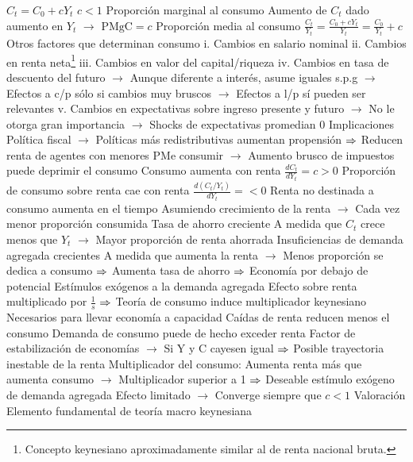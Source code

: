 \documentclass{nuevotema}
\begin{document}
\begin{esquemal}
				\4 $C_t = C_0 + c Y_t$
				\4[] $ c < 1$
				\4 Proporción marginal al consumo
				\4[] Aumento de $C_t$ dado aumento en $Y_t$
				\4[] $\to$ $\text{PMgC} = c$
				\4 Proporción media al consumo
				\4[] $\frac{C_t}{Y_t} = \frac{C_0 +c Y_t}{Y_t} = \frac{C_0}{Y_t} +c$
				\4 Otros factores que determinan consumo
				\4[] i. Cambios en salario nominal
				\4[] ii. Cambios en renta neta\footnote{Concepto keynesiano aproximadamente similar al de renta nacional bruta.}
				\4[] iii. Cambios en valor del capital/riqueza
				\4[] iv. Cambios en tasa de descuento del futuro
				\4[] $\to$ Aunque diferente a interés, asume iguales s.p.g
				\4[] $\to$ Efectos a c/p sólo si cambios muy bruscos
				\4[] $\to$ Efectos a l/p sí pueden ser relevantes
				\4[] v. Cambios en expectativas sobre ingreso presente y futuro
				\4[] $\to$ No le otorga gran importancia
				\4[] $\to$ Shocks de expectativas promedian 0
			\3 Implicaciones
				\4 Política fiscal
				\4[] $\to$ Políticas más redistributivas aumentan propensión
				\4[] $\Rightarrow$ Reducen renta de agentes con menores PMe consumir
				\4[] $\to$ Aumento brusco de impuestos puede deprimir el consumo
				\4 Consumo aumenta con renta
				\4[] $\frac{d C_t}{d Y_t} = c > 0$
				\4 Proporción de consumo sobre renta cae con renta
				\4[] $\frac{d (C_t / Y_t)}{d Y_t} = < 0$
				\4 Renta no destinada a consumo aumenta en el tiempo
				\4[] Asumiendo crecimiento de la renta
				\4[] $\to$ Cada vez menor proporción consumida
				\4 Tasa de ahorro creciente
				\4[] A medida que $C_t$ crece menos que $Y_t$
				\4[] $\to$ Mayor proporción de renta ahorrada
				\4 Insuficiencias de demanda agregada crecientes
				\4[] A medida que aumenta la renta
				\4[] $\to$ Menos proporción se dedica a consumo
				\4[] $\Rightarrow$ Aumenta tasa de ahorro
				\4[] $\Rightarrow$ Economía por debajo de potencial
				\4 Estímulos exógenos a la demanda agregada
				\4[] Efecto sobre renta multiplicado por $\frac{1}{s}$
				\4[] $\Rightarrow$ Teoría de consumo induce multiplicador keynesiano
				\4[] Necesarios para llevar economía a capacidad
				\4 Caídas de renta reducen menos el consumo
				\4[] Demanda de consumo puede de hecho exceder renta
				\4[] Factor de estabilización de economías
				\4[] $\to$ Si Y y C cayesen igual
				\4[] $\Rightarrow$ Posible trayectoria inestable de la renta
				\4 Multiplicador del consumo:
				\4[] Aumenta renta más que aumenta consumo
				\4[] $\to$ Multiplicador superior a 1
				\4[] $\Rightarrow$ Deseable estímulo exógeno de demanda agregada
				\4[] Efecto limitado
				\4[] $\to$ Converge siempre que $c<1$
			\3 Valoración
				\4 Elemento fundamental de teoría macro keynesiana

\end{esquemal}
\end{document}
